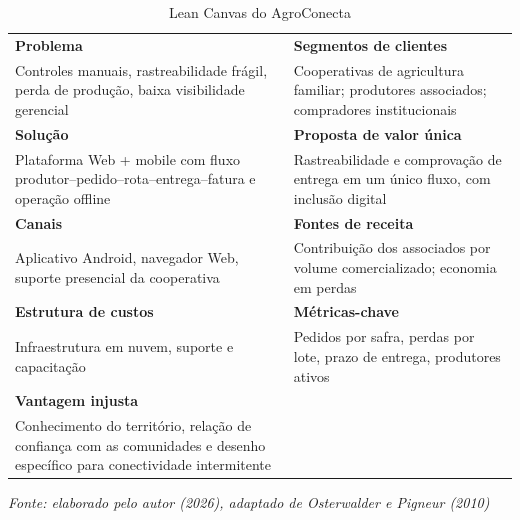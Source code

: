 \begin{table}[H]
  \centering
  \caption{Lean Canvas do AgroConecta}
  \label{tab:canvas}
  \fontsize{9}{11}\selectfont
  \begin{tabular}{L{7.2cm}L{7.2cm}}
    \toprule
    \textbf{Problema} & \textbf{Segmentos de clientes} \\
    Controles manuais, rastreabilidade frágil, perda de produção, baixa
    visibilidade gerencial & Cooperativas de agricultura familiar; produtores
    associados; compradores institucionais \\
    \midrule
    \textbf{Solução} & \textbf{Proposta de valor única} \\
    Plataforma Web + mobile com fluxo produtor--pedido--rota--entrega--fatura e
    operação offline & Rastreabilidade e comprovação de entrega em um único
    fluxo, com inclusão digital \\
    \midrule
    \textbf{Canais} & \textbf{Fontes de receita} \\
    Aplicativo Android, navegador Web, suporte presencial da cooperativa &
    Contribuição dos associados por volume comercializado; economia em perdas \\
    \midrule
    \textbf{Estrutura de custos} & \textbf{Métricas-chave} \\
    Infraestrutura em nuvem, suporte e capacitação & Pedidos por safra, perdas
    por lote, prazo de entrega, produtores ativos \\
    \midrule
    \textbf{Vantagem injusta} & \\
    Conhecimento do território, relação de confiança com as comunidades e
    desenho específico para conectividade intermitente & \\
    \bottomrule
  \end{tabular}

  \vspace{2pt}
  {\fontsize{9}{11}\selectfont\itshape Fonte: elaborado pelo autor (2026),
  adaptado de Osterwalder e Pigneur (2010)}
\end{table}
